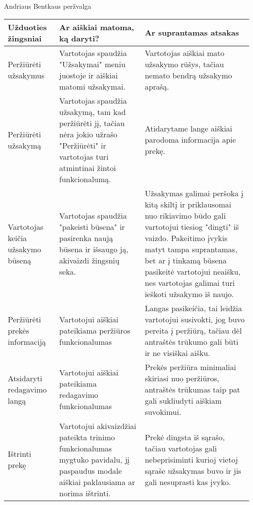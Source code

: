 \documentclass[oneside]{VUMIFPSkursinis}
\begin{document}
Andriaus Bentkaus peržvalga
\begin{center}
	\begin{tabular}{ |p{3cm}| p{6cm} | p{8cm} | }
		\hline
		Užduoties žingsniai & Ar aiškiai matoma, ką daryti? & Ar suprantamas atsakas \\ \hline

		Peržiūrėti užsakymus &
		Vartotojas spaudžia "Užsakymai" meniu juostoje ir aiškiai matomi užsakymai. &
		Vartotojas aiškiai mato užsakymo rūšys, tačiau nemato bendrą užsakymo aprašą.
		\\ \hline

		Peržiūrėti užsakymą &
		Vartotojas spaudžia užsakymą, tam kad peržiūrėti jį, tačiau nėra jokio užrašo "Peržiūrėti" ir vartotojas turi atmintinai žintoi funkcionalumą. &
		Atidarytame lange aiškiai parodoma informacija apie prekę.
		\\ \hline

		Vartotojas keičia užsakymo būseną &
		Vartotojas spaudžia "pakeisti būsena" ir pasirenka naują būsena ir išsaugo ją, akivaizdi žingsnių seka. &
		Užsakymas galimai peršoka į kitą skiltį ir priklausomai nuo rikiavimo būdo gali vartotojui tiesiog "dingti" iš vaizdo.
		Pakeitimo įvykis matyt tampa suprantamas, bet ar į tinkamą būsena pasikeitė vartotojui neaišku, nes vartotojas galimai turi ieškoti užsakymo iš naujo.
		\\ \hline

		Peržiūrėti prekės informaciją &
		Vartotojui aiškiai pateikiama peržiūros funkcionalumas &
		Langas pasikeičia, tai leidžia vartotojui susivokti, jog buvo pereita į peržiūrą, tačiau dėl antraštės trūkumo gali būti ir ne visiškai aišku.
		\\ \hline

		Atsidaryti redagavimo langą &
		Vartotojui aiškiai pateikiama redagavimo funkcionalumas &
		Prekės peržiūra minimaliai skiriasi nuo peržiūros, antraštės trūkumas taip pat gali sukliudyti aiškiam suvokimui.
		\\ \hline

		Ištrinti prekę &
		Vartotojui akivaizdžiai pateikta trinimo funkcionalumas mygtuko pavidalu, jį paspaudus modale aiškiai paklausiama ar norima ištrinti. &
		Prekė dingsta iš sąrašo, tačiau vartotojas gali nebeprisiminti kurioj vietoj sąraše užsakymas buvo ir jis gali nesuprasti kas įvyko.
		\\ \hline
	\end{tabular}
\end{center}


\pagebreak
\end{document}

